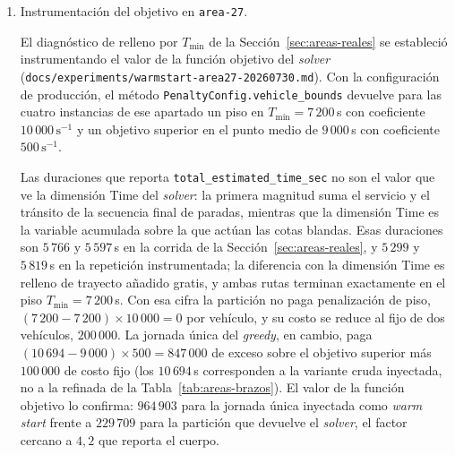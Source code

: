 \begin{enumerate}
La Sección~\ref{sec:posibles-mejoras} menciona una compuerta de régimen por saturación, descartada,
que activaría \texttt{upper-tmax-tmin9000} por encima de $\overline{\text{sat}} \gtrsim 0{,}9$. La
re-medición sobre \texttt{crossings\_road} invierte el signo del efecto precisamente en el régimen
que la compuerta habilitaría: la mediana de auto-cruces sobre el trazado de calles sube de $43$ a
$69$ en \texttt{reference-n1607} ($\overline{\text{sat}} = 0{,}94$), de $46$ a $75$ en
\texttt{battery-n1000} ($0{,}91$) y de $26$ a $59$ en \texttt{battery-n800} ($0{,}89$).

\item Instrumentación del objetivo en \texttt{area-27}.
\label{anx:objetivo-area27}

El diagnóstico de relleno por $T_{\min}$ de la Sección~\ref{sec:areas-reales} se estableció
instrumentando el valor de la función objetivo del \textit{solver}
(\texttt{docs/experiments/warmstart-area27-20260730.md}). Con la configuración de producción, el
método \texttt{PenaltyConfig.vehicle\_bounds} devuelve para las cuatro instancias de ese apartado
un piso en $T_{\min} = 7\,200$\,s con coeficiente $10\,000\,\text{s}^{-1}$ y un objetivo superior
en el punto medio de $9\,000$\,s con coeficiente $500\,\text{s}^{-1}$.

Las duraciones que reporta \texttt{total\_estimated\_time\_sec} no son el valor que ve la dimensión
Time del \textit{solver}: la primera magnitud suma el servicio y el tránsito de la secuencia final
de paradas, mientras que la dimensión Time es la variable acumulada sobre la que actúan las cotas
blandas. Esas duraciones son $5\,766$ y $5\,597$\,s en la corrida de la
Sección~\ref{sec:areas-reales}, y $5\,299$ y $5\,819$\,s en la repetición instrumentada; la
diferencia con la dimensión Time es relleno de trayecto añadido gratis, y ambas rutas terminan
exactamente en el piso $T_{\min} = 7\,200$\,s. Con esa cifra la partición no paga penalización de
piso, $(7\,200 - 7\,200) \times 10\,000 = 0$ por vehículo, y su costo se reduce al fijo de dos
vehículos, $200\,000$. La jornada única del \textit{greedy}, en cambio, paga
$(10\,694 - 9\,000) \times 500 = 847\,000$ de exceso sobre el objetivo superior más $100\,000$ de
costo fijo (los $10\,694$\,s corresponden a la variante cruda inyectada, no a la refinada de la
Tabla~\ref{tab:areas-brazos}). El valor de la función objetivo lo confirma: $964\,903$ para la
jornada única inyectada como \textit{warm start} frente a $229\,709$ para la partición que devuelve
el \textit{solver}, el factor cercano a $4{,}2$ que reporta el cuerpo.


\end{enumerate}

